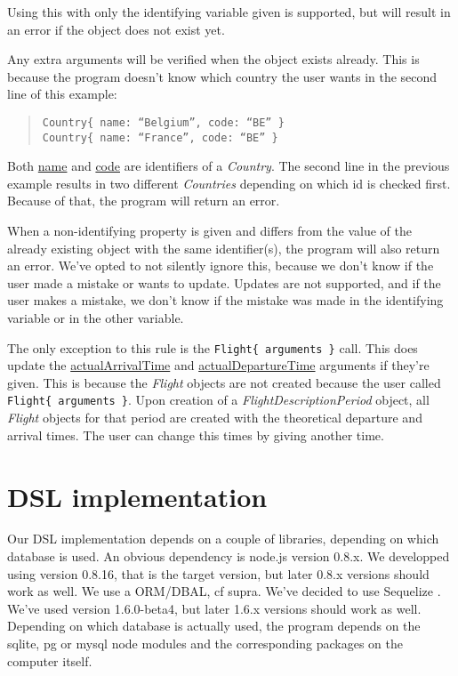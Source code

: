 \documentclass[a4paper,11pt]{article}
\newcommand{\spar}{\par \noindent}
\newcommand{\dslcode}[1]{\texttt{#1}}
\newcommand{\dsltype}[1]{\textit{#1}}
\newcommand{\dslattr}[1]{\uline{#1}}
\begin{document}
Using this with only the identifying variable given is supported, but will result in an error if the object does not exist yet.
\spar Any extra arguments will be verified when the object exists already. This is because the program doesn’t know which country the user wants in the second line of this example:
\begin{quote}\begin{verbatim}
Country{ name: “Belgium”, code: “BE” }
Country{ name: “France”, code: “BE” }
\end{verbatim}\end{quote}
Both \dslattr{name} and \dslattr{code} are identifiers of a \dsltype{Country}. The second line in the previous example results in two different \dsltype{Countries} depending on which id is checked first. Because of that, the program will return an error.
\par When a non-identifying property is given and differs from the value of the already existing object with the same identifier(s), the program will also return an error. We’ve opted to not silently ignore this, because we don’t know if the user made a mistake or wants to update. Updates are not supported, and if the user makes a mistake, we don’t know if the mistake was made in the identifying variable or in the other variable.
\par The only exception to this rule is the \dslcode{Flight\{ arguments \}} call. This does update the \dslattr{actualArrivalTime} and \dslattr{actualDepartureTime} arguments if they’re given. This is because the \dsltype{Flight} objects are not created because the user called \dslcode{Flight\{ arguments \}}. Upon creation of a \dsltype{FlightDescriptionPeriod} object, all \dsltype{Flight} objects for that period are created with the theoretical departure and arrival times. The user can change this times by giving another time.

\section{DSL implementation}

Our DSL implementation depends on a couple of libraries, depending on which database is used. An obvious dependency is node.js version 0.8.x. We developped using version 0.8.16, that is the target version, but later 0.8.x versions should work as well.
We use a ORM/DBAL, cf supra. We’ve decided to use Sequelize \citep{sequelize}. We’ve used version 1.6.0-beta4, but later 1.6.x versions should work as well.
Depending on which database is actually used, the program depends on the sqlite, pg or mysql node modules and the corresponding packages on the computer itself.
\end{document}
